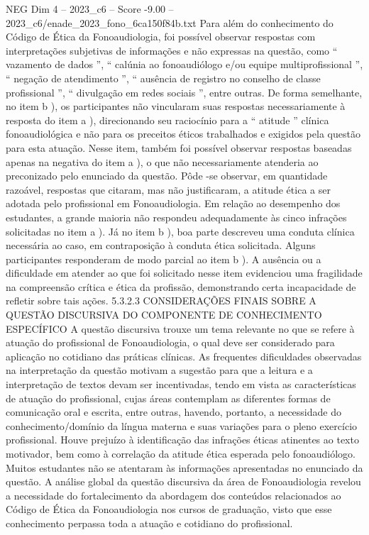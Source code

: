 \begin{textsample}{NEG Dim 4 – 2023\_c6 – Score -9.00 – 2023\_c6/enade\_2023\_fono\_6ca150f84b.txt}
Para além do conhecimento do Código de Ética da Fonoaudiologia, foi possível observar respostas com interpretações subjetivas de informações e não expressas na questão, como “ vazamento de dados ”, “ calúnia ao fonoaudiólogo e/ou equipe multiprofissional ”, “ negação de atendimento ”, “ ausência de registro no conselho de classe profissional ”, “ divulgação em redes sociais ”, entre outras.
De forma semelhante, no item b ), os participantes não vincularam suas respostas necessariamente à resposta do item a ), direcionando seu raciocínio para a “ atitude ” clínica fonoaudiológica e não para os preceitos éticos trabalhados e exigidos pela questão para esta atuação.
Nesse item, também foi possível observar respostas baseadas apenas na negativa do item a ), o que não necessariamente atenderia ao preconizado pelo enunciado da questão.
Pôde -se observar, em quantidade razoável, respostas que citaram, mas não justificaram, a atitude ética a ser adotada pelo profissional em Fonoaudiologia.
Em relação ao desempenho dos estudantes, a grande maioria não respondeu adequadamente às cinco infrações solicitadas no item a ).
Já no item b ), boa parte descreveu uma conduta clínica necessária ao caso, em contraposição à conduta ética solicitada.
Alguns participantes responderam de modo parcial ao item b ).
A ausência ou a dificuldade em atender ao que foi solicitado nesse item evidenciou uma fragilidade na compreensão crítica e ética da profissão, demonstrando certa incapacidade de refletir sobre tais ações. 5.3.2.3 CONSIDERAÇÕES FINAIS SOBRE A QUESTÃO DISCURSIVA DO COMPONENTE DE CONHECIMENTO ESPECÍFICO A questão discursiva trouxe um tema relevante no que se refere à atuação do profissional de Fonoaudiologia, o qual deve ser considerado para aplicação no cotidiano das práticas clínicas.
As frequentes dificuldades observadas na interpretação da questão motivam a sugestão para que a leitura e a interpretação de textos devam ser incentivadas, tendo em vista as características de atuação do profissional, cujas áreas contemplam as diferentes formas de comunicação oral e escrita, entre outras, havendo, portanto, a necessidade do conhecimento/domínio da língua materna e suas variações para o pleno exercício profissional.
Houve prejuízo à identificação das infrações éticas atinentes ao texto motivador, bem como à correlação da atitude ética esperada pelo fonoaudiólogo.
Muitos estudantes não se atentaram às informações apresentadas no enunciado da questão.
A análise global da questão discursiva da área de Fonoaudiologia revelou a necessidade do fortalecimento da abordagem dos conteúdos relacionados ao Código de Ética da Fonoaudiologia nos cursos de graduação, visto que esse conhecimento perpassa toda a atuação e cotidiano do profissional.

\end{textsample}

